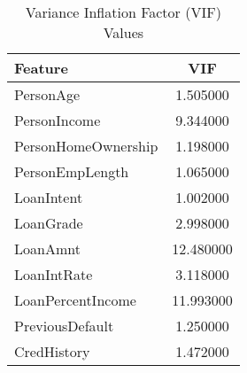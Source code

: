 \begin{table}[H]\centering
\caption{Variance Inflation Factor (VIF) Values}
\label{Table 4:vif_values}
\begin{tabular}{lc}
\toprule
Feature & VIF \\
\midrule
PersonAge & 1.505000 \\
PersonIncome & 9.344000 \\
PersonHomeOwnership & 1.198000 \\
PersonEmpLength & 1.065000 \\
LoanIntent & 1.002000 \\
LoanGrade & 2.998000 \\
LoanAmnt & 12.480000 \\
LoanIntRate & 3.118000 \\
LoanPercentIncome & 11.993000 \\
PreviousDefault & 1.250000 \\
CredHistory & 1.472000 \\
\bottomrule
\end{tabular}
\end{table}
